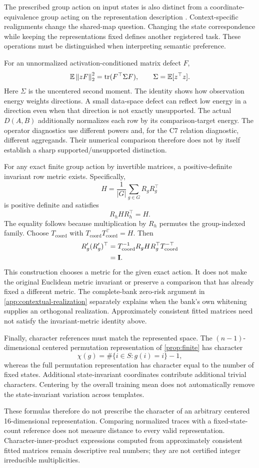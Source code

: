 The prescribed group action on input states is also
distinct from a coordinate-equivalence group acting on
the representation description
\citep{yao2026groupaction}.
Context-specific realignments change the shared-map
question.
Changing the state correspondence while keeping the
representations fixed defines another registered task.
These operations must be distinguished when interpreting
semantic preference.

For an unnormalized activation-conditioned matrix
defect $F$,
\[
 \mathbb E\left\lVert zF\right\rVert_2^2
 =
 \operatorname{tr}(F^\top\Sigma F),
 \qquad
 \Sigma=\mathbb E[z^\top z].
\]
Here $\Sigma$ is the uncentered second moment.
The identity shows how observation energy weights
directions.
A small data-space defect can reflect low energy in a
direction even when that direction is not exactly
unsupported.
The actual $D(A,B)$ additionally normalizes each row by
its comparison-target energy.
The operator diagnostics use different powers and, for
the C7 relation diagnostic, different aggregands.
Their numerical comparison therefore does not by itself
establish a sharp supported/unsupported distinction.

For any exact finite group action by invertible matrices,
a positive-definite invariant row metric exists.
Specifically,
\[
 H=\frac1{|G|}\sum_{g\in G}R_gR_g^\top
\]
is positive definite and satisfies
\[
 R_hHR_h^\top=H.
\]
The equality follows because multiplication by $R_h$
permutes the group-indexed family.
Choose $T_{\mathrm{coord}}$ with
$T_{\mathrm{coord}}T_{\mathrm{coord}}^\top=H$.
Then
\[
 \begin{aligned}
 R'_g(R'_g)^\top
 &=
 T_{\mathrm{coord}}^{-1}
 R_gHR_g^\top
 T_{\mathrm{coord}}^{-\top}\\
 &=\mathbf{I}.
 \end{aligned}
\]
This construction chooses a metric for the given exact
action.
It does not make the original Euclidean metric invariant
or preserve a comparison that has already fixed a
different metric.
The complete-bank zero-risk argument in
\cref{app:contextual-realization} separately explains
when the bank's own whitening supplies an orthogonal
realization.
Approximately consistent fitted matrices need not
satisfy the invariant-metric identity above.

Finally, character references must match the represented
space.
The $(n-1)$-dimensional centered permutation
representation of \cref{prop:finite} has character
\[
 \chi(g)=\#\{i\in S:g(i)=i\}-1,
\]
whereas the full permutation representation has
character equal to the number of fixed states.
Additional state-invariant coordinates contribute
additional trivial characters.
Centering by the overall training mean does not
automatically remove the state-invariant variation
across templates.

These formulas therefore do not prescribe the character
of an arbitrary centered 16-dimensional representation.
Comparing normalized traces with a fixed-state-count
reference does not measure distance to every valid
representation.
Character-inner-product expressions computed from
approximately consistent fitted matrices remain
descriptive real numbers; they are not certified
integer irreducible multiplicities.
